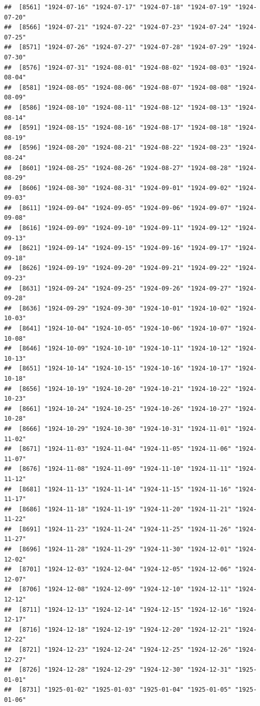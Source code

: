 \documentclass{article}\usepackage[]{graphicx}\usepackage[]{color}
\makeatletter
\newenvironment{kframe}{%
 \def\at@end@of@kframe{}%
 \ifinner\ifhmode%
  \def\at@end@of@kframe{\end{minipage}}%
  \begin{minipage}{\columnwidth}%
 \fi\fi%
 \def\FrameCommand##1{\hskip\@totalleftmargin \hskip-\fboxsep
 \colorbox{shadecolor}{##1}\hskip-\fboxsep
     \hskip-\linewidth \hskip-\@totalleftmargin \hskip\columnwidth}%
 \MakeFramed {\advance\hsize-\width
   \@totalleftmargin\z@ \linewidth\hsize
   \@setminipage}}%
 {\par\unskip\endMakeFramed%
 \at@end@of@kframe}
\newenvironment{knitrout}{}{} %
\makeatother
\begin{document}
\begin{description}
\begin{knitrout}
\begin{kframe}
\begin{verbatim}
##  [8561] "1924-07-16" "1924-07-17" "1924-07-18" "1924-07-19" "1924-07-20"
##  [8566] "1924-07-21" "1924-07-22" "1924-07-23" "1924-07-24" "1924-07-25"
##  [8571] "1924-07-26" "1924-07-27" "1924-07-28" "1924-07-29" "1924-07-30"
##  [8576] "1924-07-31" "1924-08-01" "1924-08-02" "1924-08-03" "1924-08-04"
##  [8581] "1924-08-05" "1924-08-06" "1924-08-07" "1924-08-08" "1924-08-09"
##  [8586] "1924-08-10" "1924-08-11" "1924-08-12" "1924-08-13" "1924-08-14"
##  [8591] "1924-08-15" "1924-08-16" "1924-08-17" "1924-08-18" "1924-08-19"
##  [8596] "1924-08-20" "1924-08-21" "1924-08-22" "1924-08-23" "1924-08-24"
##  [8601] "1924-08-25" "1924-08-26" "1924-08-27" "1924-08-28" "1924-08-29"
##  [8606] "1924-08-30" "1924-08-31" "1924-09-01" "1924-09-02" "1924-09-03"
##  [8611] "1924-09-04" "1924-09-05" "1924-09-06" "1924-09-07" "1924-09-08"
##  [8616] "1924-09-09" "1924-09-10" "1924-09-11" "1924-09-12" "1924-09-13"
##  [8621] "1924-09-14" "1924-09-15" "1924-09-16" "1924-09-17" "1924-09-18"
##  [8626] "1924-09-19" "1924-09-20" "1924-09-21" "1924-09-22" "1924-09-23"
##  [8631] "1924-09-24" "1924-09-25" "1924-09-26" "1924-09-27" "1924-09-28"
##  [8636] "1924-09-29" "1924-09-30" "1924-10-01" "1924-10-02" "1924-10-03"
##  [8641] "1924-10-04" "1924-10-05" "1924-10-06" "1924-10-07" "1924-10-08"
##  [8646] "1924-10-09" "1924-10-10" "1924-10-11" "1924-10-12" "1924-10-13"
##  [8651] "1924-10-14" "1924-10-15" "1924-10-16" "1924-10-17" "1924-10-18"
##  [8656] "1924-10-19" "1924-10-20" "1924-10-21" "1924-10-22" "1924-10-23"
##  [8661] "1924-10-24" "1924-10-25" "1924-10-26" "1924-10-27" "1924-10-28"
##  [8666] "1924-10-29" "1924-10-30" "1924-10-31" "1924-11-01" "1924-11-02"
##  [8671] "1924-11-03" "1924-11-04" "1924-11-05" "1924-11-06" "1924-11-07"
##  [8676] "1924-11-08" "1924-11-09" "1924-11-10" "1924-11-11" "1924-11-12"
##  [8681] "1924-11-13" "1924-11-14" "1924-11-15" "1924-11-16" "1924-11-17"
##  [8686] "1924-11-18" "1924-11-19" "1924-11-20" "1924-11-21" "1924-11-22"
##  [8691] "1924-11-23" "1924-11-24" "1924-11-25" "1924-11-26" "1924-11-27"
##  [8696] "1924-11-28" "1924-11-29" "1924-11-30" "1924-12-01" "1924-12-02"
##  [8701] "1924-12-03" "1924-12-04" "1924-12-05" "1924-12-06" "1924-12-07"
##  [8706] "1924-12-08" "1924-12-09" "1924-12-10" "1924-12-11" "1924-12-12"
##  [8711] "1924-12-13" "1924-12-14" "1924-12-15" "1924-12-16" "1924-12-17"
##  [8716] "1924-12-18" "1924-12-19" "1924-12-20" "1924-12-21" "1924-12-22"
##  [8721] "1924-12-23" "1924-12-24" "1924-12-25" "1924-12-26" "1924-12-27"
##  [8726] "1924-12-28" "1924-12-29" "1924-12-30" "1924-12-31" "1925-01-01"
##  [8731] "1925-01-02" "1925-01-03" "1925-01-04" "1925-01-05" "1925-01-06"

\end{verbatim}
\end{kframe}
\end{knitrout}
\end{description}
\end{document}
